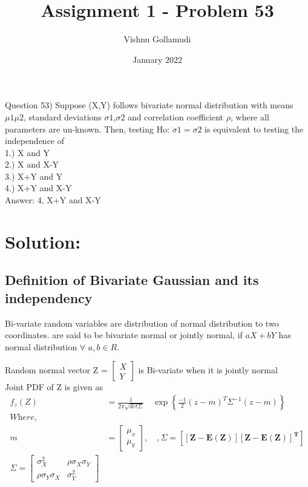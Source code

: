 \documentclass{article}
\title{Assignment 1 - Problem 53}
\author{Vishnu Gollamudi}
\date{January 2022}
\begin{document}
\maketitle

Question 53) Suppose (X,Y) follows bivariate normal distribution with means $\mu1  \mu2$, standard deviations $\sigma1$,$\sigma2$ and correlation coefficient $\rho$, where all parameters are un-known. Then, testing Ho: $\sigma1=\sigma2$ is equivalent to testing the independence of  
\\
1.) X and Y \\
2.) X and X-Y \\
3.) X+Y and Y \\
4.) X+Y and X-Y \\

Answer: 4, X+Y and X-Y \\
\section{Solution:} 
\subsection{Definition of Bivariate Gaussian and its independency}
Bi-variate random variables are distribution of normal distribution to two coordinates. are said to be bivariate normal or jointly normal, if $aX+bY$ has normal distribution $\forall$ $a,b \in R$.

Random normal vector Z =
$\begin{bmatrix}
 X\\
 Y
\end{bmatrix}$ is Bi-variate when it is jointly normal\\
Joint PDF of Z is given as\\
\begin{align*}
    f_z(Z) &= \frac{1} {2\pi\sqrt{det {\Sigma}}} \quad \exp \left \{  \frac{-1}{2}(z-m) ^ T \Sigma^{-1} (z-m) \right \} \\
    \textit{Where},\\
    \textit{m} &= \begin{bmatrix}
         \mu_x\\
         \mu_y
        \end{bmatrix}, \quad, \Sigma = \mathbf{[[Z - E(Z)] [Z - E(Z)]^T]}\\
    \Sigma = \begin{bmatrix}
         \sigma_{X}^2               &    \rho \sigma_{X} \sigma_{Y}\\
         \rho \sigma_{Y} \sigma_{X}  &    \sigma_{Y}^2
        \end{bmatrix}
\end{align*}
\end{document}
